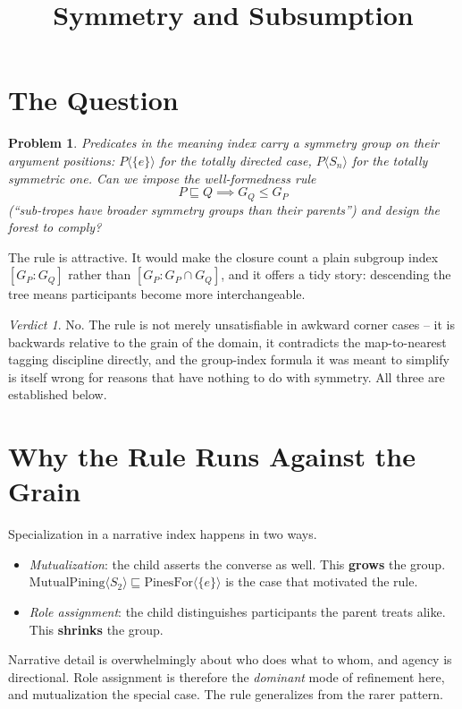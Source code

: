 \documentclass{amsart}
\newtheorem*{prob}{Problem}
\theoremstyle{remark}
\newtheorem*{verdict}{Verdict}
\begin{document}
    \title{Symmetry and Subsumption}
    \section{The Question}
    \begin{prob}
        Predicates in the meaning index carry a symmetry group on their argument positions: $P\langle\{e\}\rangle$ for the totally directed case, $P\langle S_n\rangle$ for the totally symmetric one. Can we impose the well-formedness rule
        \[
            P \sqsubseteq Q \implies G_Q \leq G_P
        \]
        (``sub-tropes have broader symmetry groups than their parents'') and design the forest to comply?
    \end{prob}
    The rule is attractive. It would make the closure count a plain subgroup index $[G_P : G_Q]$ rather than $[G_P : G_P \cap G_Q]$, and it offers a tidy story: descending the tree means participants become more interchangeable.

    \begin{verdict}
        No. The rule is not merely unsatisfiable in awkward corner cases -- it is backwards relative to the grain of the domain, it contradicts the map-to-nearest tagging discipline directly, and the group-index formula it was meant to simplify is itself wrong for reasons that have nothing to do with symmetry. All three are established below.
    \end{verdict}

    \section{Why the Rule Runs Against the Grain}
    Specialization in a narrative index happens in two ways.
    \begin{itemize}
        \item \emph{Mutualization}: the child asserts the converse as well. This \textbf{grows} the group. $\mathrm{MutualPining}\langle S_2\rangle \sqsubseteq \mathrm{PinesFor}\langle\{e\}\rangle$ is the case that motivated the rule.
        \item \emph{Role assignment}: the child distinguishes participants the parent treats alike. This \textbf{shrinks} the group.
    \end{itemize}
    Narrative detail is overwhelmingly about who does what to whom, and agency is directional. Role assignment is therefore the \emph{dominant} mode of refinement here, and mutualization the special case. The rule generalizes from the rarer pattern.
\end{document}
